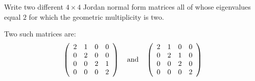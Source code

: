 \documentclass{ximera}
\begin{document}
\begin{exercise} \label{c10.5.2}
Write two different $4\times 4$ Jordan normal form matrices all
of whose eigenvalues equal $2$ for which the geometric
multiplicity is two.

\begin{solution}

\ans Two such matrices are:
\[
\left(\begin{array}{rrrr}
2 & 1 & 0 & 0 \\
0 & 2 & 0 & 0 \\
0 & 0 & 2 & 1 \\
0 & 0 & 0 & 2 \end{array}\right)
\quad\mbox{and}\quad
\left(\begin{array}{rrrr}
2 & 1 & 0 & 0 \\
0 & 2 & 1 & 0 \\
0 & 0 & 2 & 0 \\
0 & 0 & 0 & 2 \end{array}\right)
\]

\end{solution}
\end{exercise}
\end{document}
